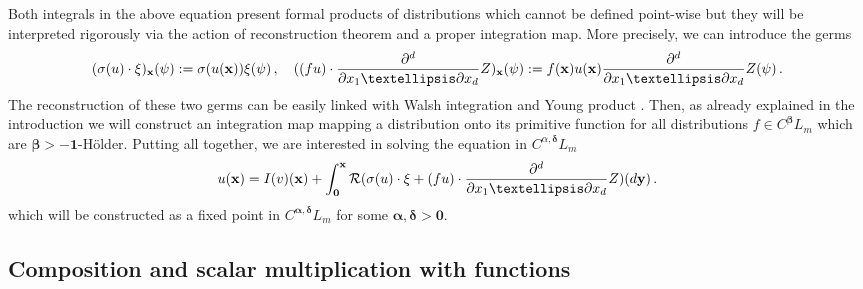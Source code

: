 \documentclass[12pt]{article}
\numberwithin{equation}{section}
\theoremstyle{plain}
\theoremstyle{definition}
\def\cR{\mathcal{R}}\def\cE{\mathcal{E}}
\def\fy{\mathbf y}\def\fz{\mathbf z}
\def\falpha{{\boldsymbol\alpha}}
\def\fbeta{{\boldsymbol\beta}}
\def\fdelta{{\boldsymbol\delta}}
\def\foo{{\boldsymbol 0}}
\def\fone{{\boldsymbol 1}}
\begin{document}
Both integrals in the above equation present formal products of distributions which cannot be defined point-wise but they will be interpreted rigorously via the action of reconstruction theorem and a proper integration map. More precisely, we can introduce the germs
\[(\sigma(u)\cdot  \xi)_{\fx}(\psi) := \sigma(u(\fx))\xi(\psi)\,, \quad  ((fu)\cdot \frac{\partial^d }{\partial x_1\ldots\partial x_d}Z)_{\fx}(\psi):= f(\fx)u(\fx)\frac{\partial^d }{\partial x_1\ldots\partial x_d}Z(\psi)\,. \]
The  reconstruction of these two germs can be easily linked with Walsh integration \cite{walsh1986} and Young product \cite{zambotti2020}. Then, as already explained in the introduction we will construct an integration map mapping a distribution onto its primitive function
for all distributions $f\in C^\fbeta L_m$ which are $\fbeta>-\fone$-H\"older.
Putting all together, we are interested in solving the  equation in $C^{\alpha,\fdelta}L_m$ 
\begin{equation}\label{eq:FixedPointGoal}
    u(\fx) =  I(v)(\fx) +\int_{\foo}^{\fx}\cR(\sigma(u)\cdot  \xi + (fu)\cdot \frac{\partial^d }{\partial x_1\ldots\partial x_d}Z)(d\fy)\,.
\end{equation} 
which will be constructed as a fixed point in $C^{\falpha,\fdelta}L_m$ for some $\falpha,\fdelta > \foo$.



\subsection{Composition and scalar multiplication with functions}
\end{document}
